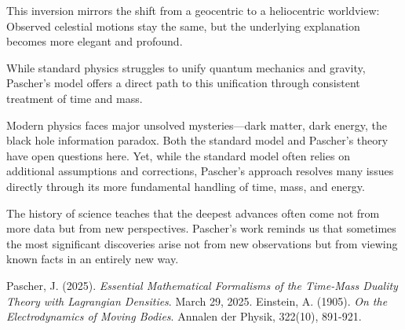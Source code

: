 \documentclass[a4paper,12pt]{article}
\begin{document}
	This inversion mirrors the shift from a geocentric to a heliocentric worldview: Observed celestial motions stay the same, but the underlying explanation becomes more elegant and profound.
	
	While standard physics struggles to unify quantum mechanics and gravity, Pascher’s model offers a direct path to this unification through consistent treatment of time and mass.
	
	Modern physics faces major unsolved mysteries—dark matter, dark energy, the black hole information paradox. Both the standard model and Pascher’s theory have open questions here. Yet, while the standard model often relies on additional assumptions and corrections, Pascher’s approach resolves many issues directly through its more fundamental handling of time, mass, and energy.
	
	The history of science teaches that the deepest advances often come not from more data but from new perspectives. Pascher’s work reminds us that sometimes the most significant discoveries arise not from new observations but from viewing known facts in an entirely new way.
	
	\begin{thebibliography}{2}
		 Pascher, J. (2025). \textit{Essential Mathematical Formalisms of the Time-Mass Duality Theory with Lagrangian Densities}. March 29, 2025.
		 Einstein, A. (1905). \textit{On the Electrodynamics of Moving Bodies}. Annalen der Physik, 322(10), 891-921.
	\end{thebibliography}
	
\end{document}
